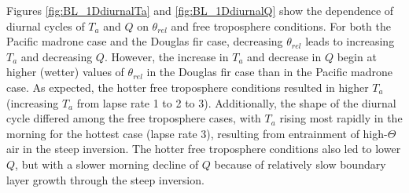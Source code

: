 
Figures \ref{fig:BL_1DdiurnalTa} and \ref{fig:BL_1DdiurnalQ} show the dependence of diurnal cycles of $T_a$ and $Q$ on $\theta_{rel}$ and free troposphere conditions.  For both the Pacific madrone case and the Douglas fir case, decreasing $\theta_{rel}$ leads to increasing $T_a$ and decreasing $Q$.  However, the increase in $T_a$ and decrease in $Q$ begin at higher (wetter) values of $\theta_{rel}$ in the Douglas fir case than in the Pacific madrone case.  As expected, the hotter free troposphere conditions resulted in higher $T_a$ (increasing $T_a$ from lapse rate 1 to 2 to 3).  Additionally, the shape of the diurnal cycle differed among the free troposphere cases, with $T_a$ rising most rapidly in the morning for the hottest case (lapse rate 3), resulting from entrainment of high-$\Theta$ air in the steep inversion.  The hotter free troposphere conditions also led to lower $Q$, but with a slower morning decline of $Q$ because of relatively slow boundary layer growth through the steep inversion.

